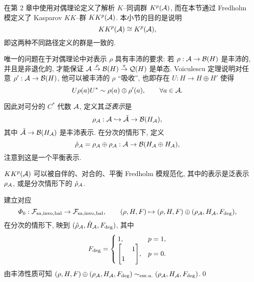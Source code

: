 在第 2 章中使用对偶理论定义了解析 $ K $--同调群 $ K^p(\mathcal{A}) $, 而在本节通过 Fredholm 模定义了 Kasparov $ KK $--群 $ KK^p(\mathcal{A}) $. 本小节的目的是说明
\[
	KK^p(\mathcal{A})\cong K^p(\mathcal{A}),
\]
即这两种不同路径定义的群是一致的.

唯一的问题在于对偶理论中对表示 $ \rho $ 具有丰沛的要求: 若 $ \rho : \mathcal{A}\to\mathcal{B}(H) $ 是丰沛的, 并且是非退化的, 才能保证 $ \mathcal{A}\stackrel{\rho}{\to}\mathcal{B}(H)\stackrel{\pi}{\to}\mathcal{Q}(H) $ 是单态. Voiculescu 定理说明对任意 $ \rho' : \mathcal{A}\to\mathcal{B}(H) $, 他可以被丰沛的 $ \rho $ ``吸收'', 也即存在 $ U : H\to H\oplus H' $ 使得
\[
	U\rho(a)U^*\sim\rho(a)\oplus\rho'(a),\qquad \forall a\in\mathcal{A}.
\]

因此对可分的 $ C^* $ 代数 $ \mathcal{A} $, 定义其\emph{泛表示}是
\[
	\rho_{\mathcal{A}} : \mathcal{A}\hookrightarrow\tilde{\mathcal{A}}\to\mathcal{B}(H_{\mathcal{A}}),
\]
其中 $ \tilde{\mathcal{A}}\to\mathcal{B}(H_{\mathcal{A}}) $ 是丰沛表示. 在分次的情形下, 定义
\[
	\hat{\rho}_{\mathcal{A}}=\rho_{\mathcal{A}}\oplus\rho_{\mathcal{A}} : \mathcal{A}\to\mathcal{B}(H_{\mathcal{A}}\oplus H_{\mathcal{A}}),
\]
注意到这是一个平衡表示.

\begin{Lemma}
	$ KK^p(\mathcal{A}) $ 可以被自伴的、对合的、平衡 Fredholm 模规范化, 其中的表示是泛表示 $ \rho_{\mathcal{A}} $, 或是分次情形下的 $ \hat{\rho}_{\mathcal{A}} $.
\end{Lemma}
\begin{Proof}
	建立对应
	\[
		\varPhi_0 : \mathcal{F}_{\text{sa},\text{invo},\text{bal}}\to\mathcal{F}_{\text{sa},\text{invo},\text{bal}},\qquad (\rho, H, F)\mapsto(\rho, H, F)\oplus(\rho_{\mathcal{A}}, H_{\mathcal{A}}, F_{\text{deg}}),
	\]
	在分次的情形下, 映到 $ (\hat{\rho}_{\mathcal{A}}, \hat{H}_{\mathcal{A}}, F_{\text{deg}}) $, 其中
	\[
		F_{\text{deg}}=\begin{cases}
			1, & p=1,\\ \mqty[ & 1 \\ 1 &], & p=0.
		\end{cases}
	\]
	由丰沛性质可知 $ (\rho, H, F)\oplus(\rho_{\mathcal{A}}, H_{\mathcal{A}}, F_{\text{deg}})\sim_{\text{ess}. u.}(\rho_{\mathcal{A}}, H_{\mathcal{A}}, F_{\text{deg}}) $.\qed
\end{Proof}

